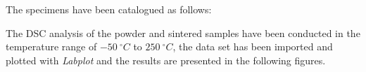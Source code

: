 \documentclass{article}
\begin{document}
                The specimens have been catalogued as follows: %

                    \begin{table}[h!]
                        \caption{All catalogued DSC samples}
                    \label{tab:DSC_ID}
                    \end{table}


                The DSC analysis of the powder and sintered samples have been conducted in the temperature range of $-50 \ ^{\circ}C$ to $250 \ ^{\circ}C$, 
                the data set has been imported and plotted with \textit{Labplot} \autocites{Labplot} and the results are presented in the following figures. \\
\end{document}
